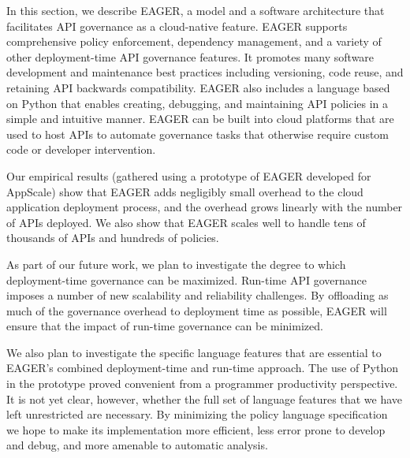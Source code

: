 In this section, we describe EAGER, a model and a software architecture that 
facilitates API governance as a cloud-native feature. EAGER supports comprehensive policy
enforcement, dependency management, and a variety of other deployment-time API
governance features. It promotes many software development and maintenance
best practices including versioning, code reuse, and retaining API backwards
compatibility. EAGER also includes a language based on Python that enables
creating, debugging, and maintaining API policies in a simple and intuitive
manner. EAGER can be built into cloud platforms that are used to host APIs
to automate governance tasks that otherwise require custom code or developer intervention.

Our empirical results (gathered using a prototype of EAGER developed for AppScale)
show that EAGER adds negligibly small overhead to the cloud application 
deployment process, and the overhead grows linearly
with the number of APIs deployed. We also show that EAGER scales well 
to handle tens of thousands of APIs and hundreds of policies. 


As part of our future work, we plan to investigate the degree to which
deployment-time governance can be maximized.
Run-time API governance imposes a number of new scalability and
reliability challenges.  By offloading as much of the governance overhead to
deployment time as possible, EAGER will ensure that the impact of run-time
governance can be minimized.  

We also plan to investigate the specific language features that are essential
to EAGER's combined deployment-time and run-time approach.  The use of Python
in the prototype proved convenient from a programmer productivity perspective.
It is not yet clear, however, whether the full set of language features that
we have left unrestricted are necessary.  By minimizing the policy language
specification we hope to make its implementation more efficient, less
error prone to develop and debug, and more amenable to automatic analysis.

